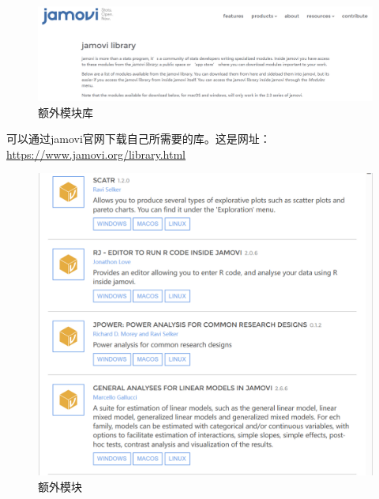 \documentclass[]{ctexbook}
\theoremstyle{definition}
\theoremstyle{definition}
\theoremstyle{definition}
\theoremstyle{definition}
\theoremstyle{remark}
\begin{document}
\begin{figure}

{\centering \includegraphics[width=1\linewidth]{img/jamovi/modules-library} 

}

\caption{额外模块库}\label{fig:jamovi-modules-library}
\end{figure}

可以通过jamovi官网下载自己所需要的库。这是网址：\url{https://www.jamovi.org/library.html}

\begin{figure}

{\centering \includegraphics[width=1\linewidth]{img/jamovi/modules1} 

}

\caption{额外模块}\label{fig:jamovi-modules1}
\end{figure}
\end{document}
